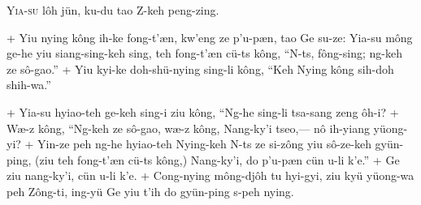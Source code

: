 \header
\lettrine{Y}{ia-su} lôh jün, ku-du tao Z-keh peng-zing.
\par
\hspace{1ex}
+	Yiu nying kông ih-ke fong-t'æn, kw'eng ze p'u-pæn, tao Ge su-ze: Yia-su mông ge-he yiu siang-sing-keh sing, teh fong-t'æn cü-ts kông, ``N-ts, fông-sing; ng-keh ze sô-gao.''
+	Yiu kyi-ke doh-shü-nying sing-li kông, ``Keh Nying kông sih-doh shih-wa.''
\par
+	Yia-su hyiao-teh ge-keh sing-i ziu kông, ``Ng-he sing-li tsa-sang zeng ôh-i?
+	Wæ-z kông, ``Ng-keh ze sô-gao, wæ-z kông, Nang-ky'i tseo,--- nô ih-yiang yüong-yi?
+	Yin-ze peh ng-he hyiao-teh Nying-keh N-ts ze si-zông yiu sô-ze-keh gyün-ping, (ziu teh fong-t'æn cü-ts kông,) Nang-ky'i, do p'u-pæn cün u-li k'e.''
+	Ge ziu nang-ky'i, cün u-li k'e.
+	Cong-nying mông-djôh tu hyi-gyi, ziu kyü yüong-wa peh Zông-ti, ing-yü Ge yiu t'ih do gyün-ping s-peh nying.
\par
